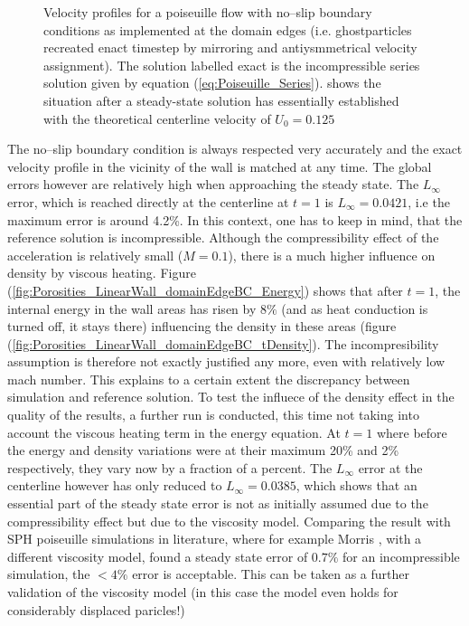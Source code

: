 \documentclass{report}
\begin{document}
\begin{figure}[!htbp]
\caption[Velocity profiles Poiseuille flow]{Velocity profiles for a poiseuille flow with no--slip boundary conditions as implemented at the domain edges (i.e. ghostparticles recreated enact timestep by mirroring and antiysmmetrical velocity assignment). The solution labelled exact is the incompressible series solution given by equation (\ref{eq:Poiseuille_Series}).   shows the situation after a steady-state solution has essentially established with the theoretical centerline velocity of $U_0=0.125$}

\end{figure}



The no--slip boundary condition is always respected very accurately and the exact velocity profile in the vicinity of the wall is matched at any time.
The global errors however are relatively high when approaching the steady state. The $L_\infty$ error, which is reached directly at the centerline at $t=1$ is $L_\infty=0.0421$, i.e the maximum error is around 4.2\%. In this context, one has to keep in mind, that the reference solution is incompressible. Although the compressibility effect of the acceleration is relatively small ($M=0.1$), there is a much higher influence on density by viscous heating. Figure (\ref{fig:Porosities_LinearWall_domainEdgeBC_Energy}) shows that after $t=1$, the internal energy in the wall areas has risen by $8\%$ (and as heat conduction is turned off, it stays there) influencing the density in these areas (figure (\ref{fig:Porosities_LinearWall_domainEdgeBC_tDensity}). The incompresibility assumption is therefore not exactly justified any more, even with relatively low mach number. This explains to a certain extent the discrepancy between simulation and reference solution. To test the influece of the density effect in the quality of the results, a further run is conducted, this time not taking into account the viscous heating term in the energy equation. At $t=1$ where before the energy and density variations were at their maximum 20\% and 2\% respectively, they vary now by a fraction of a percent. The $L_\infty$ error at the centerline however has only reduced to $L_\infty=0.0385$, which shows that an essential part of the steady state error is not as initially assumed due to the compressibility effect but due to the viscosity model.  
Comparing the result with SPH poiseuille simulations in literature, where for example Morris \cite{Morris1997}, with a different viscosity model, found a steady state error of $0.7\%$ for an incompressible simulation, the $<4\%$ error is acceptable. This can be taken as a further validation of the viscosity model (in this case the model even holds for considerably displaced paricles!)
\end{document}
